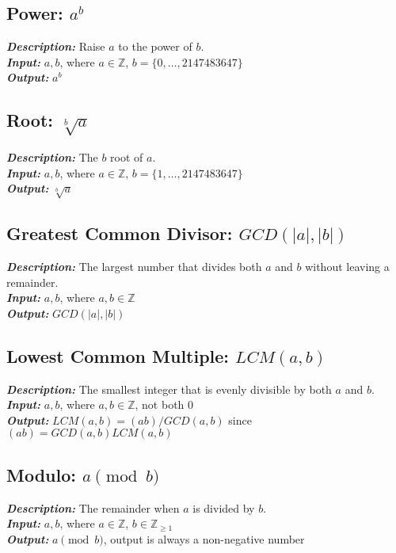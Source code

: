 \documentclass[12pt,oneside,a4paper]{article}
\begin{document}
\subsection*{Power: $a^b$}
\textbf{\emph{Description:}} Raise $a$ to the power of $b$. \\
\textbf{\emph{Input:}} $a,b$, where $a \in \mathbb{Z}$, $b = \{0,\dots,2147483647\}$ \\
\textbf{\emph{Output:}} $a^b$

\subsection*{Root: $\sqrt[b]{a}$}
\textbf{\emph{Description:}} The $b$ root of $a$. \\
\textbf{\emph{Input:}} $a,b$, where $a \in \mathbb{Z}$, $b = \{1,\dots,2147483647\}$ \\
\textbf{\emph{Output:}} $\sqrt[b]{a}$

\subsection*{Greatest Common Divisor: $GCD(|a|, |b|)$}
\textbf{\emph{Description:}} The largest number that divides both $a$ and $b$ without leaving a remainder. \\
\textbf{\emph{Input:}} $a,b$, where $a,b \in \mathbb{Z}$ \\
\textbf{\emph{Output:}} $GCD(|a|, |b|)$

\subsection*{Lowest Common Multiple: $LCM(a,b)$}
\textbf{\emph{Description:}} The smallest integer that is evenly divisible by both $a$ and $b$. \\
\textbf{\emph{Input:}} $a,b$, where $a,b \in \mathbb{Z}$, not both $0$ \\
\textbf{\emph{Output:}} $LCM(a,b) = (ab)/GCD(a,b)$ since $(ab)=GCD(a,b)LCM(a,b)$

\subsection*{Modulo: $a \pmod b$}
\textbf{\emph{Description:}} The remainder when $a$ is divided by $b$. \\
\textbf{\emph{Input:}} $a,b$, where $a \in \mathbb{Z}$, $b \in \mathbb{Z}_{\geq 1}$ \\
\textbf{\emph{Output:}} $a \pmod b$, output is always a non-negative number
\end{document}

